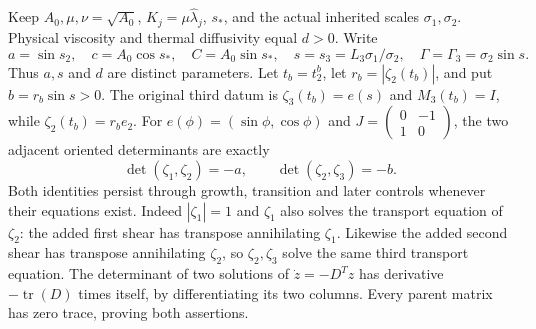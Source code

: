 Keep $A_0,\mu,\nu=\sqrt{A_0}$, $K_j=\mu\widehat\lambda_j$,
$s_*$, and the actual inherited scales $\sigma_1,\sigma_2$.
Physical viscosity and thermal diffusivity equal $d>0$.
Write
\begin{equation}\label{cvlane:tt:constants}
 a=\sin s_2,\quad c=A_0\cos s_*,\quad C=A_0\sin s_*,
 \quad s=s_3=L_3\sigma_1/\sigma_2,\quad
 \Gamma=\Gamma_3=\sigma_2\sin s.
\end{equation}
Thus $a,s$ and $d$ are distinct parameters. Let $t_b=t_2^b$,
let $r_b=|\zeta_2(t_b)|$, and put $b=r_b\sin s>0$.
The original third datum is $\zeta_3(t_b)=e(s)$ and
$M_3(t_b)=I$, while $\zeta_2(t_b)=r_be_2$.
For $e(\phi)=(\sin\phi,\cos\phi)$ and
$J=\left(\begin{smallmatrix}0&-1\\1&0\end{smallmatrix}\right)$,
the two adjacent oriented determinants are exactly
\begin{equation}\label{cvlane:tt:determinants}
 \det(\zeta_1,\zeta_2)=-a,\qquad
 \det(\zeta_2,\zeta_3)=-b.
\end{equation}
Both identities persist through growth, transition and later controls
whenever their equations exist. Indeed $|\zeta_1|=1$ and
$\zeta_1$ also solves the transport equation of $\zeta_2$:
the added first shear has transpose annihilating $\zeta_1$.
Likewise the added second shear has transpose annihilating $\zeta_2$,
so $\zeta_2,\zeta_3$ solve the same third transport equation.
The determinant of two solutions of $\dot z=-D^Tz$ has derivative
$-\operatorname{tr}(D)$ times itself, by differentiating its two
columns. Every parent matrix has zero trace, proving both assertions.

